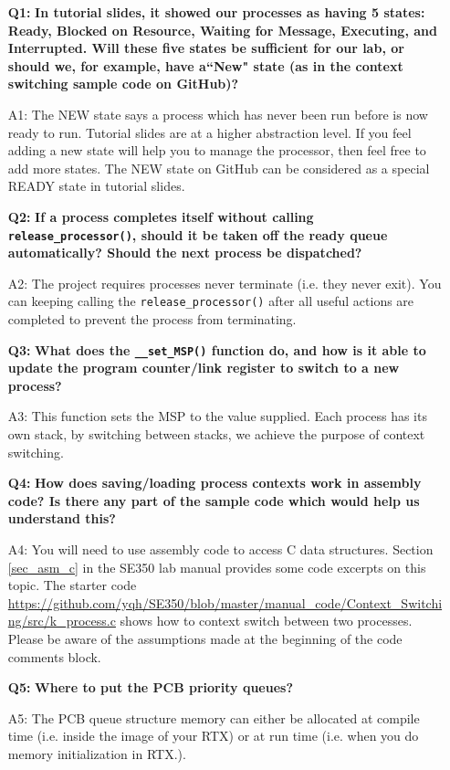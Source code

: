 \begin{itemize}
\item[{\bf Q1:}] {\bf In tutorial slides, it showed our processes as having 5 states: Ready, Blocked on Resource, Waiting for Message, Executing, and Interrupted. Will these five states be sufficient for our lab, or should we, for example, have a``New" state (as in the context switching sample code on GitHub)?} 
\item[A1:] The NEW state says a process which has never been run before is now ready to run. Tutorial slides are at a higher abstraction level. If you feel adding a new state will help you to manage the processor, then feel free to add more states. The NEW state on GitHub can be considered as a special READY state in tutorial slides.

\item[{\bf Q2:}] {\bf If a process completes itself without calling \verb+release_processor()+, should it be taken off the ready queue automatically? Should the next process be dispatched?}
\item[A2:] The project requires processes never terminate (i.e. they never exit). You can keeping calling the \verb+release_processor()+ after all useful actions are completed to prevent the process from terminating.  

\item[{\bf Q3:}] {\bf What does the \verb+__set_MSP()+ function do, and how is it able to update the program counter/link register to switch to a new process?}
\item[A3:] This function sets the MSP to the value supplied. Each process has its own stack, by switching between stacks, we achieve the purpose of context switching.

\item[{\bf Q4:}] {\bf How does saving/loading process contexts work in assembly code? Is there any part of the sample code which would help us understand this?}
\item[A4:] You will need to use assembly code to access C data structures. Section \ref{sec_asm_c} in the SE350 lab manual provides some code excerpts on this topic. The starter code \url{https://github.com/yqh/SE350/blob/master/manual_code/Context_Switching/src/k_process.c} shows how to context switch between two processes. Please be aware of the assumptions made at the beginning of the code comments block.

\item[{\bf Q5:}] {\bf Where to put the PCB priority queues?}
\item[A5:] The PCB queue structure memory can either be allocated at compile time (i.e. inside the image of your RTX) or at run time (i.e. when you do memory initialization in RTX.).


\end{itemize}
